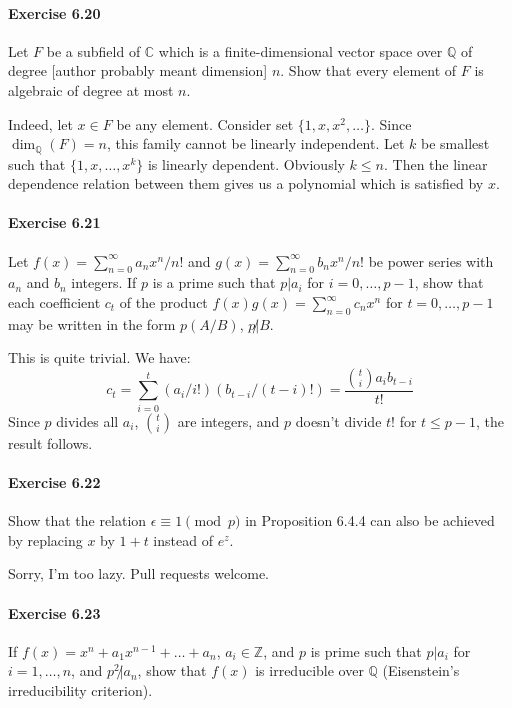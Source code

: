 \documentclass[notitlepage]{article}
\theoremstyle{definition}
\newcommand\C{\mathbb{C}}
\newcommand\Q{\mathbb{Q}}
\newcommand\Z{\mathbb{Z}}
\begin{document}
\paragraph{Exercise 6.20}
Let $F$ be a subfield of $\C$ which is a finite-dimensional vector
space over $\Q$ of degree [author probably meant dimension] $n$. Show
that every element of $F$ is algebraic of degree at most $n$.

Indeed, let $x \in F$ be any element. Consider set $\{1, x, x^2,
\ldots\}$. Since $\dim_\Q(F) = n$, this family cannot be linearly
independent. Let $k$ be smallest such that $\{1, x, \ldots, x^k\}$ is
linearly dependent. Obviously $k \leq n$. Then the linear dependence
relation between them gives us a polynomial which is satisfied by $x$.

\paragraph{Exercise 6.21}
Let $f(x) = \sum_{n=0}^\infty a_n x^n/n!$ and $g(x) =
\sum_{n=0}^\infty b_n x^n/n!$ be power series with $a_n$ and $b_n$
integers. If $p$ is a prime such that $p|a_i$ for $i = 0, \ldots,
p-1$, show that each coefficient $c_t$ of the product $f(x)g(x) =
\sum_{n=0}^\infty c_n x^n$ for $t = 0, \ldots, p-1$ may be written in
the form $p(A/B)$, $p\not | B$.

This is quite trivial. We have:
\begin{equation}
c_t = \sum_{i=0}^t (a_i/i!)(b_{t-i}/(t-i)!) = \frac{{t \choose i} a_i b_{t-i}}{t!}
\end{equation}
Since $p$ divides all $a_i$, ${t\choose i}$ are integers, and $p$
doesn't divide $t!$ for $t \leq p-1$, the result follows.

\paragraph{Exercise 6.22}
Show that the relation $\epsilon \equiv 1 \pmod p$ in Proposition
6.4.4 can also be achieved by replacing $x$ by $1+t$ instead of $e^z$.

Sorry, I'm too lazy. Pull requests welcome.

\paragraph{Exercise 6.23}
If $f(x) = x^n + a_1 x^{n-1} + \ldots + a_n$, $a_i \in \Z$, and $p$ is
prime such that $p|a_i$ for $i = 1, \ldots, n$, and $p^2 \not | a_n$,
show that $f(x)$ is irreducible over $\Q$ (Eisenstein's irreducibility
criterion).
\end{document}
